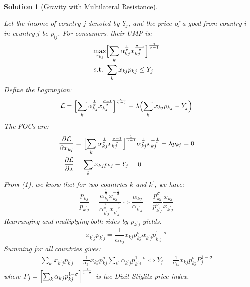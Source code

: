 \documentclass[a4paper,12pt]{article} %
\theoremstyle{nonitalic}
\newtheorem{solution}{Solution}
\begin{document}
\begin{solution}[Gravity with Multilateral Resistance]
    \

    Let the income of country $j$ denoted by $Y_j$, and the price of a good from country $i$ in country $j$ be $p_{ij}$.
    For consumers, their UMP is:
    \begin{align*}
        \max_{x_{kj}} & \Bigl[ \sum_k \alpha_{kj}^{\frac{1}{\sigma}} x_{kj}^{\frac{\sigma-1}{\sigma}}\Bigr]^{\frac{\sigma}{\sigma-1}} \\
        \text{s.t. } & \sum_k x_{kj} p_{kj} \leq Y_j
    \end{align*}
    Define the Lagrangian:
    \begin{gather*}
        \mathcal{L} = \Bigl[ \sum_k \alpha_{kj}^{\frac{1}{\sigma}} x_{kj}^{\frac{\sigma-1}{\sigma}}\Bigr]^{\frac{\sigma}{\sigma-1}} - \lambda \Bigl( \sum_k x_{kj} p_{kj} - Y_j \Bigr)
    \end{gather*}
    The FOCs are:
    \begin{align}
        \frac{\partial \mathcal{L}}{\partial x_{kj}} &= \Bigl[ \sum_k \alpha_{kj}^{\frac{1}{\sigma}} x_{kj}^{\frac{\sigma-1}{\sigma}}\Bigr]^{\frac{1}{\sigma-1}} \alpha_{kj}^{\frac{1}{\sigma}} x_{kj}^{-\frac{1}{\sigma}} - \lambda p_{kj} = 0 \\
        \frac{\partial \mathcal{L}}{\partial \lambda} &= \sum_k x_{kj} p_{kj} - Y_j = 0
    \end{align}
    From (1), we know that for two countries $k$ and $k^{\prime}$, we have:
    \[
    \frac{p_{kj}}{p_{k^{\prime} j}} = \frac{\alpha_{kj}^{\frac{1}{\sigma}} x_{kj}^{-\frac{1}{\sigma}}}{\alpha_{k^{\prime} j}^{\frac{1}{\sigma}} x_{k^{\prime} j}^{-\frac{1}{\sigma}}} \Leftrightarrow \frac{\alpha_{kj}}{\alpha_{k^{\prime} j}} = \frac{p_{kj}^{\sigma}}{p_{k^{\prime} j}^{\sigma}} \frac{x_{kj}}{x_{k^{\prime} j}}
    \]
    Rearranging and multiplying both sides by $p_{k^{\prime} j}$ yields:
    \[
    x_{k^{\prime} j} p_{k^{\prime} j} = \frac{1}{\alpha_{kj}} x_{kj} p_{kj}^{\sigma} \alpha_{k^{\prime} j} p_{k^{\prime} j}^{1-\sigma}
    \]
    Summing for all countries gives:
    \begin{gather}
        \sum_{k^{\prime}} x_{k^{\prime} j} p_{k^{\prime} j} = \frac{1}{\alpha_{kj}} x_{kj} p_{kj}^{\sigma} \sum_{k^{\prime}} \alpha_{k^{\prime} j} p_{k^{\prime} j}^{1-\sigma} \Leftrightarrow Y_j = \frac{1}{\alpha_{kj}} x_{kj} p_{kj}^{\sigma} P_j^{1-\sigma} 
    \end{gather}
    where $P_j = \Bigl[ \sum_k \alpha_{kj} p_{kj}^{1-\sigma} \Bigr]^{\frac{1}{1-\sigma}}$ is the Dixit-Stiglitz price index.


\end{solution}
\end{document}
